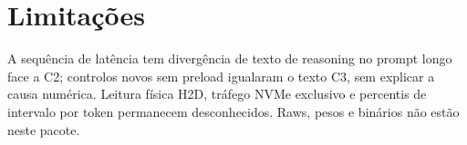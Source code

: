 \section{Limitações}
 A sequência de latência tem divergência de texto de reasoning no prompt longo face a C2; controlos novos sem preload igualaram o texto C3, sem explicar a causa numérica. Leitura física H2D, tráfego NVMe exclusivo e percentis de intervalo por token permanecem desconhecidos. Raws, pesos e binários não estão neste pacote.  
